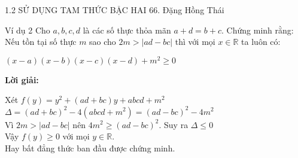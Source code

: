 \begin{frame}{1.2 SỬ DỤNG TAM THỨC BẬC HAI \hspace{3cm}  66. Đặng Hồng Thái} 
    \begin{block}{Ví dụ 2}
        Cho $a,b,c,d$ là các số thực thỏa mãn $a+d=b+c$. Chứng minh rằng: Nếu tồn tại số thực $m$ sao cho $2m>|ad-bc|$ thì với mọi $x\in \mathbb{R} $ ta luôn có: \\
        \begin{center}
            $(x-a)(x-b)(x-c)(x-d)+m^2\geq0$
        \end{center}
    \end{block} 
    \begin{center}
        \textbf{Lời giải:}
    \end{center}
        Xét $f(y)=y^2+(ad+bc)y+abcd+m^2$ \\
        \vspace{0,2cm} \pause
        \hspace{1cm} $\Delta = (ad+bc)^2-4(abcd+m^2)=(ad-bc)^2-4m^2 $ \\
        \vspace{0,2cm} \pause
        Vì $2m>|ad-bc|$ nên $4m^2\geq(ad-bc)^2$. Suy ra $\Delta\leq0$ \\
        \vspace{0,2cm} \pause
        Vậy $f(y)\geq0$ với mọi $y\in \mathbb{R}$. \\
        \vspace{0,2cm}
        Hay bất đẳng thức ban đầu được chứng minh. 
\end{frame}

